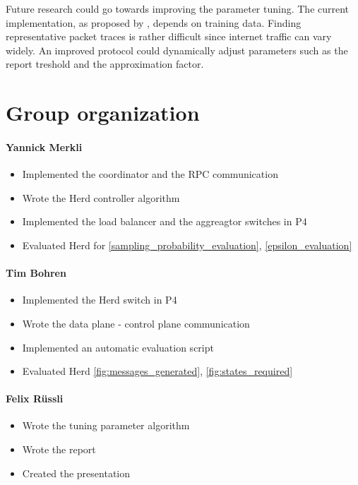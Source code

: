 \documentclass[11pt,oneside,a4paper]{article}
\begin{document}
Future research could go towards improving the parameter tuning. The current implementation, as proposed by \cite{anon2019herd}, depends on training data. Finding representative packet traces is rather difficult since internet traffic can vary widely. An improved protocol could dynamically adjust parameters such as the report treshold and the approximation factor.


\label{lastpage} %
\clearpage
{}



\clearpage
\appendix
{}

\section{Group organization}

\paragraph{Yannick Merkli}
\begin{itemize}
	\item Implemented the coordinator and the RPC communication
	\item Wrote the Herd controller algorithm
	\item Implemented the load balancer and the aggreagtor switches in P4
	\item Evaluated Herd for \ref{sampling_probability_evaluation}, \ref{epsilon_evaluation}
\end{itemize}


\paragraph{Tim Bohren}
\begin{itemize}
	\item Implemented the Herd switch in P4
	\item Wrote the data plane - control plane communication
	\item Implemented an automatic evaluation script
	\item Evaluated Herd  \ref{fig:messages_generated}, \ref{fig:states_required}
\end{itemize}

\paragraph{Felix Rüssli}
\begin{itemize}
	\item Wrote the tuning parameter algorithm
	\item Wrote the report
	\item Created the presentation
\end{itemize}
\end{document}
